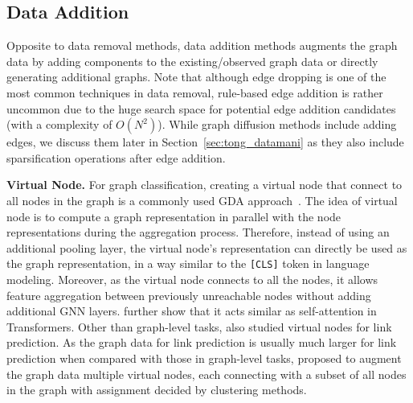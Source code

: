 \documentclass[11pt]{article}
\renewcommand\paragraph[1]{\vspace{0.05in} \noindent \textbf{#1.}}
\begin{document}
\subsection{Data Addition}
\label{sec:tong_dataadd}
Opposite to data removal methods, data addition methods augments the graph data by adding components to the existing/observed graph data or directly generating additional graphs. Note that although edge dropping is one of the most common techniques in data removal, rule-based edge addition is rather uncommon due to the huge search space for potential edge addition candidates (with a complexity of $O(N^2)$). While graph diffusion methods include adding edges, we discuss them later in Section~\ref{sec:tong_datamani} as they also include sparsification operations after edge addition.

\paragraph{Virtual Node}
For graph classification, creating a virtual node that connect to all nodes in the graph is a commonly used GDA approach~\cite{gilmer2017neural,li2017learning,ishiguro2019graph,hu2021ogb,ying2021transformers}. The idea of virtual node is to compute a graph representation in parallel with the node representations during the aggregation process. Therefore, instead of using an additional pooling layer, the virtual node's representation can directly be used as the graph representation, in a way similar to the \texttt{[CLS]} token in language modeling. Moreover, as the virtual node connects to all the nodes, it allows feature aggregation between previously unreachable nodes without adding additional GNN layers. \citet{ying2021transformers} further show that it acts similar as self-attention in Transformers. Other than graph-level tasks, \citet{hwang2021revisiting} also studied virtual nodes for link prediction. As the graph data for link prediction is usually much larger for link prediction when compared with those in graph-level tasks, \citet{hwang2021revisiting} proposed to augment the graph data multiple virtual nodes, each connecting with a subset of all nodes in the graph with assignment decided by clustering methods.
\end{document}
